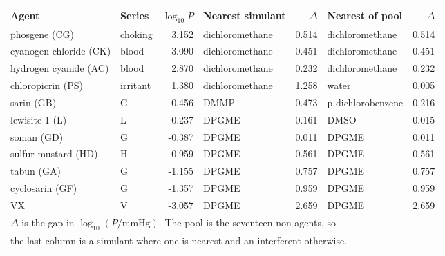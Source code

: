 \begin{tabular}{llrlrlr}
\hline
Agent & Series & $\log_{10}P$ & Nearest simulant & $\Delta$ & Nearest of pool & $\Delta$ \\
\hline
phosgene (CG) & choking & 3.152 & dichloromethane & 0.514 & dichloromethane & 0.514 \\
cyanogen chloride (CK) & blood & 3.090 & dichloromethane & 0.451 & dichloromethane & 0.451 \\
hydrogen cyanide (AC) & blood & 2.870 & dichloromethane & 0.232 & dichloromethane & 0.232 \\
chloropicrin (PS) & irritant & 1.380 & dichloromethane & 1.258 & water & 0.005 \\
sarin (GB) & G & 0.456 & DMMP & 0.473 & p-dichlorobenzene & 0.216 \\
lewisite 1 (L) & L & -0.237 & DPGME & 0.161 & DMSO & 0.015 \\
soman (GD) & G & -0.387 & DPGME & 0.011 & DPGME & 0.011 \\
sulfur mustard (HD) & H & -0.959 & DPGME & 0.561 & DPGME & 0.561 \\
tabun (GA) & G & -1.155 & DPGME & 0.757 & DPGME & 0.757 \\
cyclosarin (GF) & G & -1.357 & DPGME & 0.959 & DPGME & 0.959 \\
VX & V & -3.057 & DPGME & 2.659 & DPGME & 2.659 \\
\hline
\multicolumn{7}{l}{\footnotesize $\Delta$ is the gap in $\log_{10}(P/\mathrm{mmHg})$. The pool is the seventeen non-agents, so}\\
\multicolumn{7}{l}{\footnotesize the last column is a simulant where one is nearest and an interferent otherwise.}\\
\end{tabular}
